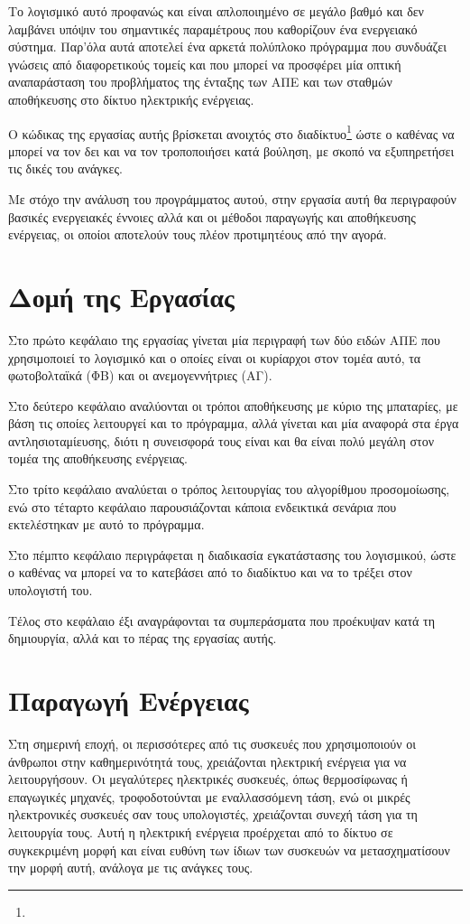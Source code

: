 \documentclass[12pt]{report}
\begin{document}
Το λογισμικό αυτό προφανώς και είναι απλοποιημένο σε μεγάλο βαθμό και δεν λαμβάνει υπόψιν του σημαντικές παραμέτρους που καθορίζουν ένα ενεργειακό σύστημα. Παρ'όλα αυτά αποτελεί ένα αρκετά πολύπλοκο πρόγραμμα που συνδυάζει γνώσεις
από διαφορετικούς τομείς και που μπορεί να προσφέρει μία οπτική αναπαράσταση του προβλήματος της ένταξης των ΑΠΕ και των σταθμών αποθήκευσης στο δίκτυο ηλεκτρικής ενέργειας.

Ο κώδικας της εργασίας αυτής βρίσκεται ανοιχτός στο διαδίκτυο\footnote{{}} ώστε ο καθένας να μπορεί να τον δει και να τον τροποποιήσει κατά βούληση, με σκοπό να εξυπηρετήσει 
τις δικές του ανάγκες.

Με στόχο την ανάλυση του προγράμματος αυτού, στην εργασία αυτή θα περιγραφούν βασικές ενεργειακές έννοιες αλλά και οι μέθοδοι παραγωγής και αποθήκευσης ενέργειας, οι οποίοι αποτελούν τους πλέον προτιμητέους από την αγορά. 

\chapter*{Δομή της Εργασίας}
Στο πρώτο κεφάλαιο της εργασίας γίνεται μία περιγραφή των δύο ειδών ΑΠΕ που χρησιμοποιεί το λογισμικό και ο οποίες είναι οι κυρίαρχοι στον τομέα αυτό, τα φωτοβολταϊκά (ΦΒ) και οι ανεμογεννήτριες (ΑΓ).

Στο δεύτερο κεφάλαιο αναλύονται οι τρόποι αποθήκευσης με κύριο της μπαταρίες, με βάση τις οποίες λειτουργεί και το πρόγραμμα, αλλά γίνεται και μία αναφορά στα έργα αντλησιοταμίευσης, διότι η συνεισφορά τους είναι και θα είναι
πολύ μεγάλη στον τομέα της αποθήκευσης ενέργειας.

Στο τρίτο κεφάλαιο αναλύεται ο τρόπος λειτουργίας του αλγορίθμου προσομοίωσης, ενώ στο τέταρτο κεφάλαιο παρουσιάζονται κάποια ενδεικτικά σενάρια που εκτελέστηκαν με αυτό το πρόγραμμα.

Στο πέμπτο κεφάλαιο περιγράφεται η διαδικασία εγκατάστασης του λογισμικού, ώστε ο καθένας να μπορεί να το κατεβάσει από το διαδίκτυο και να το τρέξει στον υπολογιστή του.

Τέλος στο κεφάλαιο έξι αναγράφονται τα συμπεράσματα που προέκυψαν κατά τη δημιουργία, αλλά και το πέρας της εργασίας αυτής.

\chapter{Παραγωγή Ενέργειας}
Στη σημερινή εποχή, οι περισσότερες από τις συσκευές που χρησιμοποιούν οι άνθρωποι στην καθημερινότητά τους, χρειάζονται ηλεκτρική ενέργεια για να λειτουργήσουν. Οι μεγαλύτερες ηλεκτρικές συσκευές, όπως θερμοσίφωνας ή επαγωγικές
μηχανές, τροφοδοτούνται με εναλλασσόμενη τάση, ενώ οι μικρές ηλεκτρονικές συσκευές σαν τους υπολογιστές, χρειάζονται συνεχή τάση για τη λειτουργία τους. Αυτή η ηλεκτρική ενέργεια προέρχεται από το δίκτυο σε συγκεκριμένη μορφή
{} και είναι ευθύνη των ίδιων των συσκευών να μετασχηματίσουν την μορφή αυτή, ανάλογα με τις ανάγκες τους.
\end{document}

